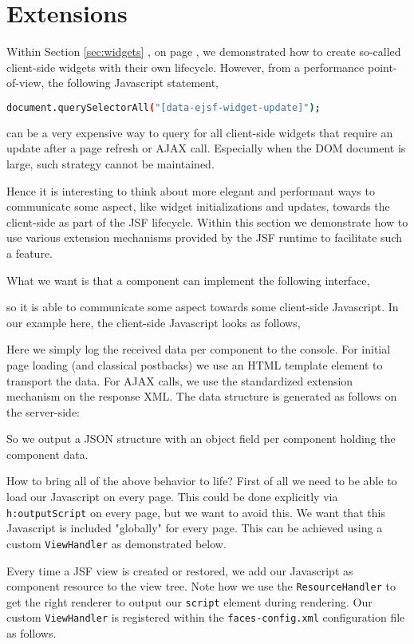 \section{Extensions}
\label{sec:extensions}
Within Section \ref{sec:widgets} , on page \pageref{sec:widgets}, we demonstrated how to create so-called client-side widgets with their own lifecycle.
However, from a performance point-of-view, the following Javascript statement,
\begin{lstlisting}[language=bash]
	document.querySelectorAll("[data-ejsf-widget-update]");
\end{lstlisting}
can be a very expensive way to query for all client-side widgets that require an update after a page refresh or AJAX call.
Especially when the DOM document is large, such strategy cannot be maintained.

Hence it is interesting to think about more elegant and performant ways to communicate some aspect, like widget initializations and updates, towards the client-side as part of the JSF lifecycle.
Within this section we demonstrate how to use various extension mechanisms provided by the JSF runtime to facilitate such a feature.

What we want is that a component can implement the following interface,

so it is able to communicate some aspect towards some client-side Javascript.
In our example here, the client-side Javascript looks as follows,

Here we simply log the received data per component to the console.
For initial page loading (and classical postbacks) we use an HTML template element to transport the data.
For AJAX calls, we use the standardized extension mechanism on the response XML.
The data structure is generated as follows on the server-side:

So we output a JSON structure with an object field per component holding the component data.

How to bring all of the above behavior to life?
First of all we need to be able to load our Javascript on every page.
This could be done explicitly via \texttt{h:outputScript} on every page, but we want to avoid this.
We want that this Javascript is included "globally" for every page.
This can be achieved using a custom \texttt{ViewHandler} as demonstrated below.

Every time a JSF view is created or restored, we add our Javascript as component resource to the view tree.
Note how we use the \texttt{ResourceHandler} to get the right renderer to output our \texttt{script} element during rendering.
Our custom \texttt{ViewHandler} is registered within the \texttt{faces-config.xml} configuration file as follows.


